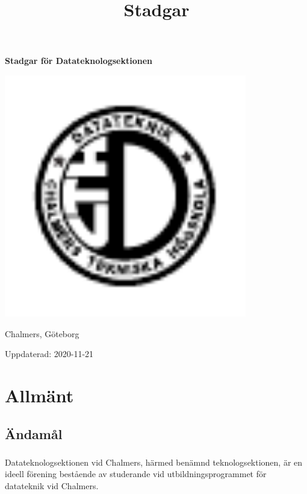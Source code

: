 \documentclass[a4paper]{dtek}
\title{Stadgar}
\newcommand{\updated}{2020-11-21} %
\begin{document}
\makeheadfoot

\vspace*{\fill}
\begin{center}
{\Huge \textbf{Stadgar för Datateknologsektionen}}
\par\bigskip
\includegraphics[width=300pt]{dteklogo.pdf}
\par\bigskip
{\LARGE Chalmers, Göteborg}
\end{center}
\vspace*{\fill}
\begin{center}
{\LARGE Uppdaterad: \updated}
\end{center}
\vspace*{\fill}


\newpage
\setcounter{tocdepth}{1}
\tableofcontents
\newpage

\section{Allmänt}
\subsection{Ändamål}
\subsubsection{}
Datateknologsektionen vid Chalmers, härmed benämnd teknologsektionen, är en ideell förening bestående av studerande vid utbildningsprogrammet för datateknik vid Chalmers.
\end{document}
